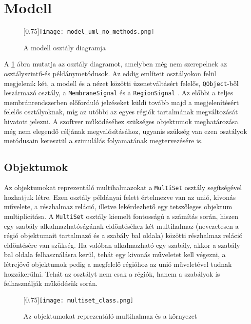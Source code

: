 \section{Modell}

\begin{figure}[H]
\advance\leftskip-3cm
	\scalebox{0.75}[0.75]{\texttt{[image: model\_uml\_no\_methods.png]}}
	\caption{A modell osztály diagramja}
	\label{fig:model_no_methods}
\end{figure}

A \ref{fig:model_no_methods} ábra mutatja az osztály diagramot, amelyben még nem szerepelnek az osztályszintű-és példánymetódusok. Az eddig említett osztályokon felül megjelenik két, a modell és a nézet közötti üzenetváltásért felelős, \verb|QObject|-ből leszármazó osztály, a \verb|MembraneSignal| és a \verb|RegionSignal| . Az előbbi a teljes membránrendszerben előforduló jelzéseket küldi tovább majd a megjelenítésért felelős osztályoknak, míg az utóbbi az egyes régiók tartalmának megváltozását hivatott jelezni. A szoftver működéséhez szükséges objektumok meghatározása még nem elegendő céljának megvalósításához, ugyanis szükség van ezen osztályok metódusain keresztül a szimulálás folyamatának megtervezésére is.

\subsection{Objektumok}

Az objektumokat reprezentáló multihalmazokat a \verb|MultiSet| osztály segítségével hozhatjuk létre. Ezen osztály példányai felett értelmezve van az unió, kivonás művelete, a részhalmaz reláció, illetve lekérdezhető egy tetszőleges objektum multiplicitása. A \verb|MultiSet| osztály kiemelt fontosságú a számítás során, hiszen egy szabály alkalmazhatóságának eldöntéséhez két multihalmaz (nevezetesen a régió objektumait tartalmazó és a szabály bal oldala) közötti részhalmaz reláció eldöntésére van szükség. Ha valóban alkalmazható egy szabály, akkor a szabály bal oldala felhasználásra kerül, tehát egy kivonás műveletet kell végezni, a létrejövő objektumok pedig a megfelelő régióhoz az unió műveletével tudnak hozzákerülni. Tehát az osztályt nem csak a régiók, hanem a szabályok is felhasználják működésük során.

\begin{figure}[H]
\centering
	\scalebox{0.75}[0.75]{\texttt{[image: multiset\_class.png]}}
	\caption{Az objektumokat reprezentáló multihalmaz és a környezet}
	\label{fig:multiset_uml}
\end{figure}

